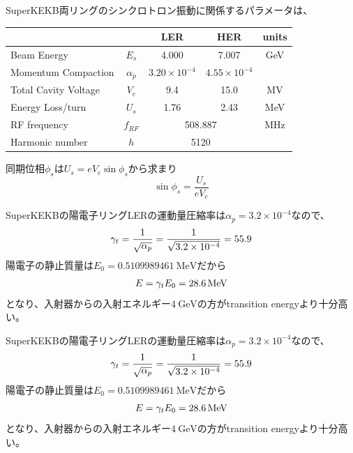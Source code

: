 \documentclass[]{jlreq}
\begin{document}
\begin{tcolorbox}[title=\textgt{SuperKEKBのシンクロトロン周波数}, breakable = true]
  SuperKEKB両リングのシンクロトロン振動に関係するパラメータは、

  \vspace{\baselineskip}

  \begin{center}
    \begin{tabular}{l|c|cc|c}
      & & LER   &   HER & units \\ \hline
      Beam Energy & $E_s$ & 4.000 & 7.007 & GeV  \\
      Momentum Compaction & $\alpha_p$ & $3.20\times 10^{-4}$& $4.55\times 10^{-4}$ & \\
      Total Cavity Voltage & $V_c$ & 9.4   &   15.0  &   MV \\
      Energy Loss/turn & $U_s$   & 1.76  &   2.43  & MeV \\
      RF frequency & $f_{RF}$ & \multicolumn{2}{c|}{508.887} & MHz \\
      Harmonic number & $h$       &   \multicolumn{2}{c|}{5120}  &
    \end{tabular}
  \end{center}
  
  \vspace{\baselineskip}

  同期位相$\phi_s$は$U_s = e V_c \sin \phi_s$から求まり
  \begin{equation}
    \sin \phi_s = \frac{U_s}{e V_c}
  \end{equation}

  SuperKEKBの陽電子リングLERの運動量圧縮率は$\alpha_p = 3.2 \times 10^{-4}$なので、
  \begin{equation}
    \gamma_t = \frac{1}{\sqrt{\alpha_p}}= \frac{1}{\sqrt{3.2 \times 10^{-4}}} = 55.9 \notag
  \end{equation}
  陽電子の静止質量は$E_0 = \SI{0.5109989461}{\mega\electronvolt}$だから
  \begin{equation}
    E = \gamma_t E_0 = \SI{28.6}{\mega\electronvolt} \notag
  \end{equation}
  となり、入射器からの入射エネルギー$\SI{4}{\giga\electronvolt}$の方がtransition energyより十分高い。

  SuperKEKBの陽電子リングLERの運動量圧縮率は$\alpha_p = 3.2 \times 10^{-4}$なので、
  \begin{equation}
    \gamma_t = \frac{1}{\sqrt{\alpha_p}}= \frac{1}{\sqrt{3.2 \times 10^{-4}}} = 55.9 \notag
  \end{equation}
  陽電子の静止質量は$E_0 = \SI{0.5109989461}{\mega\electronvolt}$だから
  \begin{equation}
    E = \gamma_t E_0 = \SI{28.6}{\mega\electronvolt} \notag
  \end{equation}
  となり、入射器からの入射エネルギー$\SI{4}{\giga\electronvolt}$の方がtransition energyより十分高い。


\end{tcolorbox}
\end{document}
